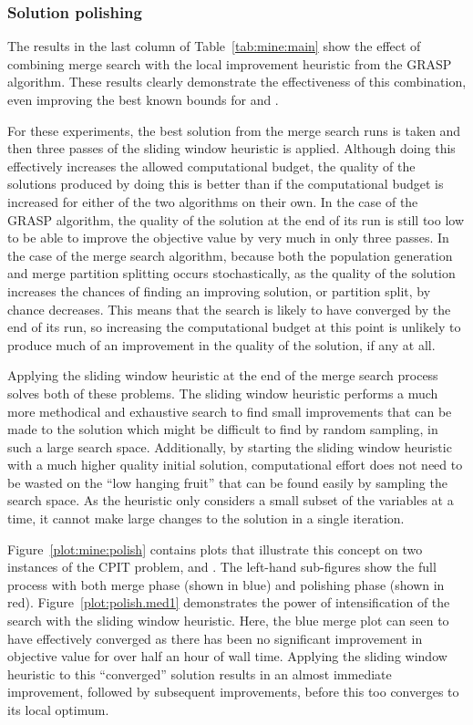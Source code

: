 \documentclass[journal]{IEEEtran}
\begin{document}
\subsubsection*{\textbf{Solution polishing}}
 
The results in the last column of Table~\ref{tab:mine:main} show the effect of combining merge search with the local improvement heuristic from the GRASP algorithm. These results clearly demonstrate the effectiveness of this combination, even improving the best known bounds for \dmine{} and \zucklarge{}. 

For these experiments, the best solution from the merge search runs is taken and then three passes of the sliding window heuristic is applied. Although doing this effectively increases the allowed computational budget, the quality of the solutions produced by doing this is better than if the computational budget is increased for either of the two algorithms on their own. In the case of the GRASP algorithm, the quality of the solution at the end of its run is still too low to be able to improve the objective value by very much in only three passes. In the case of the merge search algorithm, because both the population generation and merge partition splitting occurs stochastically, as the quality of the solution increases the chances of finding an improving solution, or partition split, by chance decreases. This means that the search is likely to have converged by the end of its run, so increasing the computational budget at this point is unlikely to produce much of an improvement in the quality of the solution, if any at all.

Applying the sliding window heuristic at the end of the merge search process solves both of these problems. The sliding window heuristic performs a much more methodical and exhaustive search to find small improvements that can be made to the solution which might be difficult to find by random sampling, in such a large search space. Additionally, by starting the sliding window heuristic with a much higher quality initial solution, computational effort does not need to be wasted on the ``low hanging fruit'' that can be found easily by sampling the search space. As the heuristic only considers a small subset of the variables at a time, it cannot make large changes to the solution in a single iteration. 

Figure~\ref{plot:mine:polish} contains plots that illustrate this concept on two instances of the CPIT problem, \zuckmed{} and \zucklarge{}. The left-hand sub-figures show the full process with both merge phase (shown in blue) and polishing phase (shown in red). Figure~\ref{plot:polish.med1} demonstrates the power of intensification of the search with the sliding window heuristic. Here, the blue merge plot can seen to have effectively converged as there has been no significant improvement in objective value for over half an hour of wall time. Applying the sliding window heuristic to this ``converged'' solution results in an almost immediate improvement, followed by subsequent improvements, before this too converges to its local optimum.
\end{document}
